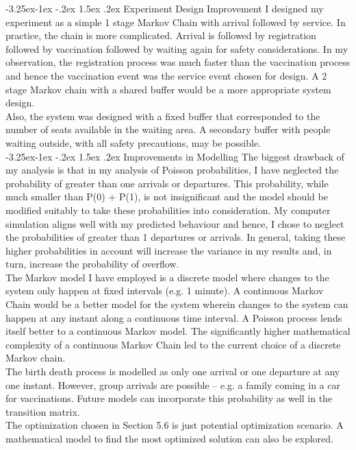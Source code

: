 \documentclass[11pt]{article}
\makeatletter
\renewcommand\subsection{\@startsection{subsection}{2}{\z@}%
                                         {-3.25ex\@plus -1ex \@minus -.2ex}%
                                         {1.5ex \@plus .2ex}%
                                         {\normalfont\fontfamily{phv}\fontsize{14}{17}\bfseries}}
\makeatother
\begin{document}
\subsection{Experiment Design Improvement}
 I designed my experiment as a simple 1 stage Markov Chain with arrival followed by service. In practice, the chain is more complicated. Arrival is followed by registration followed by vaccination followed by waiting again for safety considerations. In my observation, the registration process was much faster than the vaccination process and hence the vaccination event was the service event chosen for design. A 2 stage Markov chain with a shared buffer would be a more appropriate system design.\\
 Also, the system was designed with a fixed buffer that corresponded to the number of seats available in the waiting area. A secondary buffer with people waiting outside, with all safety precautions, may be possible.\\


\subsection{Improvements in Modelling}
 The biggest drawback of my analysis is that in my analysis of Poisson probabilities, I have neglected the probability of greater than one arrivals or departures. This probability, while much smaller than P(0) + P(1), is not insignificant and the model should be modified suitably to take these probabilities into consideration. My computer simulation aligns well with my predicted behaviour and hence, I chose to neglect the probabilities of greater than 1 departures or arrivals. In general, taking these higher probabilities in account will increase the variance in my results and, in turn, increase the probability of overflow.\\
 The Markov model I have employed is a discrete model where changes to the system only happen at fixed intervals (e.g. 1 minute). A continuous Markov Chain would be a better model for the system wherein changes to the system can happen at any instant along a continuous time interval. A Poisson process lends itself better to a continuous Markov model. The significantly higher mathematical complexity of a continuous Markov Chain led to the current choice of a discrete Markov chain.\\
 The birth death process is modelled as only one arrival or one departure at any one instant. However, group arrivals are possible – e.g. a family coming in a car for vaccinations. Future models can incorporate this probability as well in the transition matrix.\\
 The optimization chosen in Section 5.6 is just potential optimization scenario. A mathematical model to find the most optimized solution can also be explored.
\end{document}

